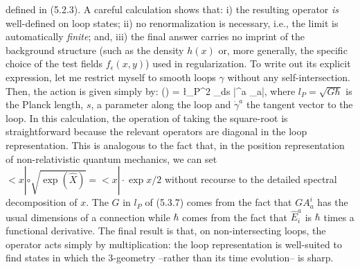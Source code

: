defined in (5.2.3). A careful calculation shows that: i) the resulting
operator {\it is} well-defined on loop states; ii) no renormalization is
necessary, i.e., the limit is automatically {\it finite}; and, iii) the final
answer carries no imprint of the background structure (such as the density
$h(x)$ or, more generally, the specific choice of the test fields
$f_\epsilon (x,y)$) used in regularization. To write out its explicit
expression, let me restrict myself to smooth loops $\gamma$ without any
self-intersection. Then, the action is given simply by:
\bneq
\langle\gamma\mid\circ{}(\omega ) = \l_P^2 \oint_\gamma ds
|\dot{\gamma}^a \omega_a|\>\cdot \langle \gamma\mid ,
where $l_P= \sqrt{G\hbar}$ is the Planck length, $s$, a parameter along
the loop and $\dot{\gamma}^a$ the tangent vector to the loop. In this
calculation, the operation of taking the square-root is straightforward
because the relevant operators are diagonal in the loop representation.
This is analogous to the fact that, in the position representation of
non-relativistic quantum mechanics, we can set $<x|\circ \sqrt{\exp (\hat{X})}
= <x|\cdot \exp x/2$ without recourse to the detailed spectral decomposition
of $x$. The $G$ in $l_P$ of (5.3.7) comes from the fact that $GA_a^i$ has
the usual dimensions of a connection while $\hbar$ comes from the fact that
$\hat{E}^a_i$ is $\hbar$ times a functional derivative. The final result is
that, on non-intersecting loops, the operator acts simply by
multiplication: the loop representation is well-suited to find states in
which the 3-geometry --rather than its time evolution-- is sharp.

